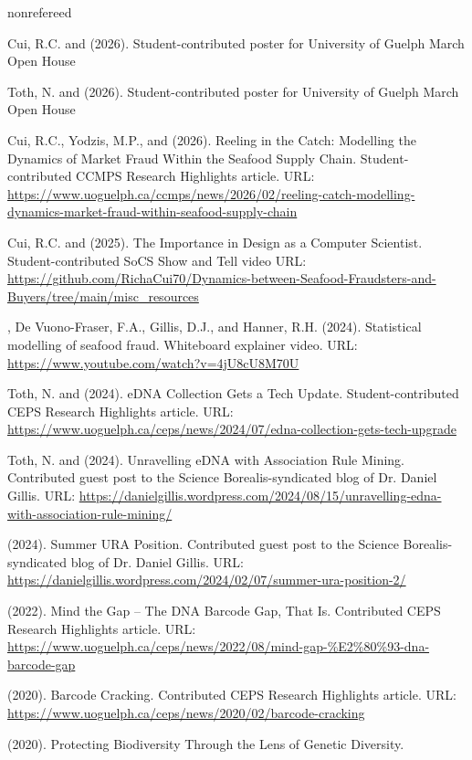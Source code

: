 \medskip
\begin{revlist}[itemsep=0.45\baselineskip]{nonrefereed}
\item \dsup Cui, R.C. and \me (2026). Student-contributed poster for University of
  Guelph March Open House
\item \dsup Toth, N. and \me (2026). Student-contributed poster for University of
  Guelph March Open House
\item \dsup Cui, R.C., Yodzis, M.P., and \me (2026). Reeling in the Catch: Modelling
  the Dynamics of Market Fraud Within the Seafood Supply Chain.
  Student-contributed CCMPS Research Highlights article. URL:
  \url{https://www.uoguelph.ca/ccmps/news/2026/02/reeling-catch-modelling-dynamics-market-fraud-within-seafood-supply-chain}
\item \dsup Cui, R.C. and \me (2025). The Importance in Design as a Computer
  Scientist. Student-contributed SoCS Show and Tell video URL:
  \url{https://github.com/RichaCui70/Dynamics-between-Seafood-Fraudsters-and-Buyers/tree/main/misc_resources}
\item \me, \dsup De Vuono-Fraser, F.A., Gillis, D.J., and Hanner, R.H. (2024).
  Statistical modelling of seafood fraud. Whiteboard explainer video. URL:
  \url{https://www.youtube.com/watch?v=4jU8cU8M70U}
\item \dsup Toth, N. and \me (2024). eDNA Collection Gets a Tech Update.
  Student-contributed CEPS Research Highlights article. URL:
  \url{https://www.uoguelph.ca/ceps/news/2024/07/edna-collection-gets-tech-upgrade}
\item \dsup Toth, N. and \me (2024). Unravelling eDNA with Association Rule
  Mining. Contributed guest post to the Science Borealis-syndicated blog of
  Dr. Daniel Gillis. URL:
  \url{https://danielgillis.wordpress.com/2024/08/15/unravelling-edna-with-association-rule-mining/}
\item \me (2024). Summer URA Position. Contributed guest post to the Science
  Borealis-syndicated blog of Dr. Daniel Gillis. URL:
  \url{https://danielgillis.wordpress.com/2024/02/07/summer-ura-position-2/}
\item \me (2022). Mind the Gap -- The DNA Barcode Gap, That Is. Contributed CEPS
  Research Highlights article. URL:
  \url{https://www.uoguelph.ca/ceps/news/2022/08/mind-gap-%E2%80%93-dna-barcode-gap}
\item \me (2020). Barcode Cracking. Contributed CEPS Research Highlights
  article. URL: \url{https://www.uoguelph.ca/ceps/news/2020/02/barcode-cracking}
\item \me (2020). Protecting Biodiversity Through the Lens of Genetic Diversity.

\end{revlist}
